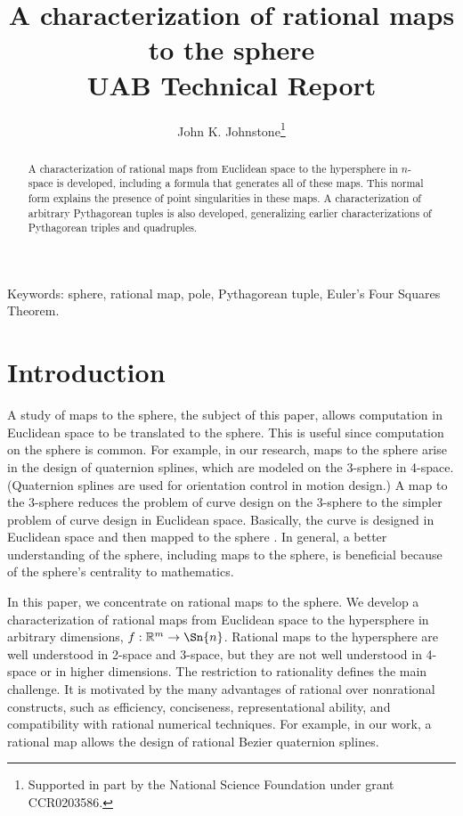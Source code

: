 \documentclass[12pt]{article}
\title{A characterization of rational maps to the sphere\\[5pt]
       {\small UAB Technical Report}} %
\author{John K. Johnstone\thanks{Supported in part by the National 
        Science Foundation under grant CCR0203586.}}
\begin{document}
\maketitle


\begin{abstract}
A characterization of rational maps from Euclidean space 
to the hypersphere  in $n$-space
is developed, including a formula that generates all of these maps.
This normal form explains the presence of point singularities in these maps.
A characterization of arbitrary Pythagorean tuples is also developed,
generalizing earlier characterizations of Pythagorean triples and quadruples.
\end{abstract}

\noindent
Keywords: sphere, rational map, pole, Pythagorean tuple, 
          Euler's Four Squares Theorem.

\section{Introduction}

A study of maps to the sphere, the subject of this paper,
allows computation in Euclidean space to be translated to the sphere.
This is useful since computation on the sphere is common.
For example, in our research, 
maps to the sphere arise in the design of quaternion splines,
which are modeled on the 3-sphere in 4-space.
(Quaternion splines are used for orientation control in motion design.)
A map to the 3-sphere reduces the problem of curve design on the 3-sphere
to the simpler problem of curve design in Euclidean space.
Basically, the curve is designed in Euclidean space 
and then mapped to the sphere \cite{rq1}.
%
In general, a better understanding of the sphere, including maps to the sphere, 
is beneficial because of the sphere's centrality to mathematics.

In this paper, we concentrate on rational maps to the sphere.
We develop a characterization of rational maps from Euclidean space
to the hypersphere in arbitrary dimensions, $f : \mathbb{R}^m \rightarrow \Sn{n}$.
Rational maps to the hypersphere are well understood in 2-space and 3-space,
but they are not well understood in 4-space or in higher dimensions.
The restriction to rationality defines the main challenge.
It is motivated by the many advantages of rational over nonrational constructs,
such as efficiency, conciseness, representational ability, and 
compatibility with rational numerical techniques.
For example, in our work, a rational map allows the design of rational Bezier
quaternion splines.
\end{document}
